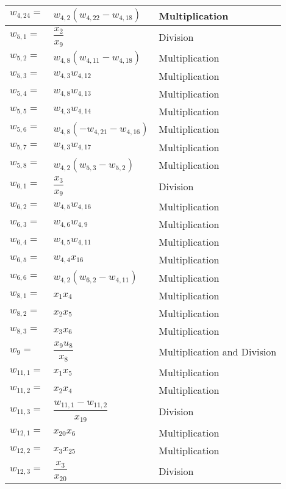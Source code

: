 \begin{longtable}{|p{1.5cm}|l|p{2cm}|}
$w_{4,24}=$ & $ w_{4,2}\left(w_{4,22}-w_{4,18}\right) $ &  Multiplication \\ \hline
$w_{5,1}=$ & $ \dfrac{x_{2}}{x_{9}} $ & Division  \\ \hline
$w_{5,2}=$ & $ w_{4,8}\left(w_{4,11}-w_{4,18}\right) $ & Multiplication  \\ \hline
$w_{5,3}=$ & $ w_{4,3}w_{4,12} $ & Multiplication \\ \hline
$w_{5,4}=$ & $ w_{4,8}w_{4,13} $ & Multiplication  \\ \hline
$w_{5,5}=$ & $ w_{4,3}w_{4,14} $ &  Multiplication  \\ \hline
$w_{5,6}=$ & $ w_{4,8}\left(-w_{4,21}-w_{4,16}\right) $ &  Multiplication  \\ \hline
$w_{5,7}=$ & $ w_{4,3}w_{4,17} $ & Multiplication \\ \hline
$w_{5,8}=$ & $ w_{4,2}\left(w_{5,3}-w_{5,2}\right) $ & Multiplication \\ \hline
$w_{6,1}=$ & $ \dfrac{x_{3}}{x_{9}} $ & Division \\ \hline
$w_{6,2}=$ & $ w_{4,5}w_{4,16} $ & Multiplication \\ \hline
$w_{6,3}=$ & $ w_{4,6}w_{4,9} $ & Multiplication \\ \hline
$w_{6,4}=$ & $ w_{4,5}w_{4,11} $ & Multiplication \\ \hline
$w_{6,5}=$ & $ w_{4,4}x_{16} $ & Multiplication \\ \hline
$w_{6,6}=$ & $ w_{4,2}\left(w_{6,2}-w_{4,11}\right) $ & Multiplication \\ \hline
$w_{8,1}=$ & $ x_{1}x_{4} $ & Multiplication \\ \hline
$w_{8,2}=$ & $ x_{2}x_{5} $ & Multiplication \\ \hline
$w_{8,3}=$ & $ x_{3}x_{6} $ & Multiplication \\ \hline
$w_{9}=$ & $ \dfrac{x_{9}u_{8}}{x_{8}} $ & Multiplication and Division \\ \hline
$w_{11,1}=$ & $ x_{1}x_{5} $ & Multiplication \\ \hline
$w_{11,2}=$ & $ x_{2}x_{4} $ & Multiplication \\ \hline
$w_{11,3}=$ & $ \dfrac{w_{11,1}-w_{11,2}}{x_{19}} $ & Division \\ \hline
$w_{12,1}=$ & $ x_{20}x_{6} $ & Multiplication \\ \hline
$w_{12,2}=$ & $ x_{3}x_{25}$ & Multiplication \\ \hline
$w_{12,3}=$ & $ \dfrac{x_{3}}{x_{20}} $ & Division \\ \hline

\end{longtable}

